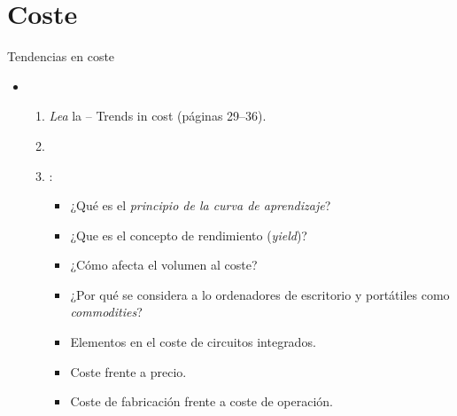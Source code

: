 \section{Coste}

\begin{frame}[t]{Tendencias en coste}
\begin{itemize}
  \item {}
    \begin{enumerate}
      \item \emph{Lea} la  -- Trends in cost (páginas 29--36).
        \item \bibhennessy

      \item {}:
        \begin{itemize}
          \item ¿Qué es el \emph{principio de la curva de aprendizaje}?
          \item ¿Que es el concepto de rendimiento (\emph{yield})?
          \item ¿Cómo afecta el volumen al coste?
          \item ¿Por qué se considera a lo ordenadores de escritorio y portátiles como
                \emph{commodities}?
          \item Elementos en el coste de circuitos integrados.
          \item Coste frente a precio.
          \item Coste de fabricación frente a coste de operación.
        \end{itemize}
    \end{enumerate}
\end{itemize}
\end{frame}
